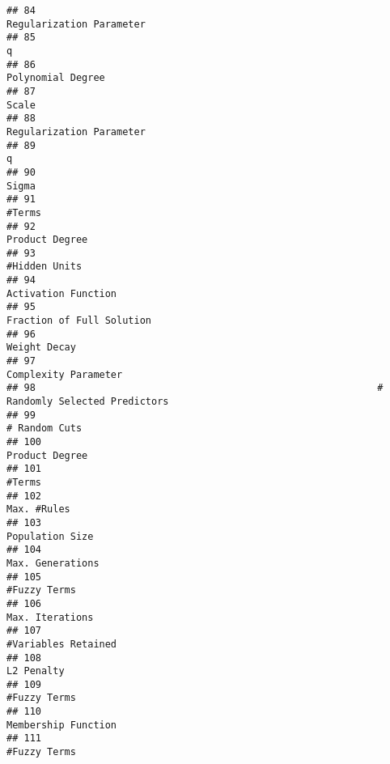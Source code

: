 \documentclass[
]{article}
\begin{document}
\begin{verbatim}
## 84                                                                 Regularization Parameter
## 85                                                                                        q
## 86                                                                        Polynomial Degree
## 87                                                                                    Scale
## 88                                                                 Regularization Parameter
## 89                                                                                        q
## 90                                                                                    Sigma
## 91                                                                                   #Terms
## 92                                                                           Product Degree
## 93                                                                            #Hidden Units
## 94                                                                      Activation Function
## 95                                                                Fraction of Full Solution
## 96                                                                             Weight Decay
## 97                                                                     Complexity Parameter
## 98                                                           # Randomly Selected Predictors
## 99                                                                            # Random Cuts
## 100                                                                          Product Degree
## 101                                                                                  #Terms
## 102                                                                             Max. #Rules
## 103                                                                         Population Size
## 104                                                                        Max. Generations
## 105                                                                            #Fuzzy Terms
## 106                                                                         Max. Iterations
## 107                                                                     #Variables Retained
## 108                                                                              L2 Penalty
## 109                                                                            #Fuzzy Terms
## 110                                                                     Membership Function
## 111                                                                            #Fuzzy Terms

\end{verbatim}
\end{document}
